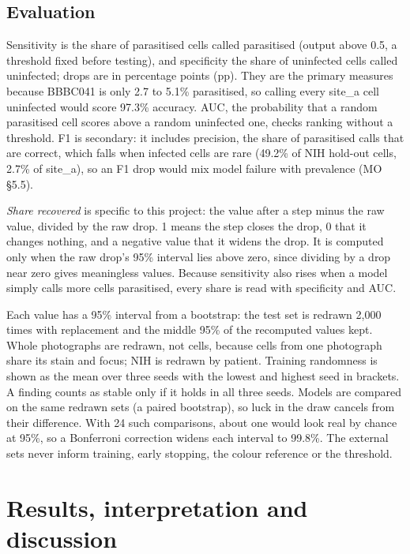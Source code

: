 \documentclass[11pt,a4paper]{article}
\begin{document}
\subsection{Evaluation}

Sensitivity is the share of parasitised cells called parasitised (output above 0.5, a threshold fixed before testing), and specificity the share of uninfected cells called uninfected; drops are in percentage points (pp). They are the primary measures because BBBC041 is only 2.7 to 5.1\% parasitised, so calling every site\_a cell uninfected would score 97.3\% accuracy. AUC, the probability that a random parasitised cell scores above a random uninfected one, checks ranking without a threshold. F1 is secondary: it includes precision, the share of parasitised calls that are correct, which falls when infected cells are rare (49.2\% of NIH hold-out cells, 2.7\% of site\_a), so an F1 drop would mix model failure with prevalence (MO \S{}5.5).

\emph{Share recovered} is specific to this project: the value after a step minus the raw value, divided by the raw drop. 1 means the step closes the drop, 0 that it changes nothing, and a negative value that it widens the drop. It is computed only when the raw drop's 95\% interval lies above zero, since dividing by a drop near zero gives meaningless values. Because sensitivity also rises when a model simply calls more cells parasitised, every share is read with specificity and AUC.

Each value has a 95\% interval from a bootstrap: the test set is redrawn 2,000 times with replacement and the middle 95\% of the recomputed values kept. Whole photographs are redrawn, not cells, because cells from one photograph share its stain and focus; NIH is redrawn by patient. Training randomness is shown as the mean over three seeds with the lowest and highest seed in brackets. A finding counts as stable only if it holds in all three seeds. Models are compared on the same redrawn sets (a paired bootstrap), so luck in the draw cancels from their difference. With 24 such comparisons, about one would look real by chance at 95\%, so a Bonferroni correction widens each interval to 99.8\%. The external sets never inform training, early stopping, the colour reference or the threshold.

\section{Results, interpretation and discussion}
\end{document}
